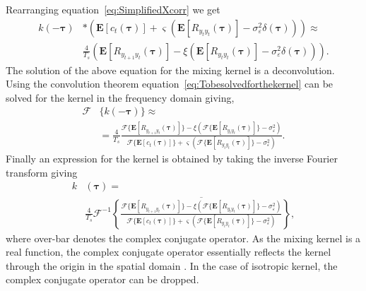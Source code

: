 \documentclass[10pt,twocolumn,twoside]{IEEEtran}
\begin{document}
Rearranging equation~\eqref{eq:SimplifiedXcorr} we get
\begin{align} \label{eq:Tobesolvedforthekernel}
	k(-\boldsymbol\tau) & \ast (\mathbf{E}\left[c_t(\boldsymbol\tau)\right] + \varsigma (\mathbf{E}\left[R_{y_ty_t}(\boldsymbol\tau)\right] - \sigma_{\varepsilon}^2 \delta(\boldsymbol\tau))) \approx  \nonumber \\
	& \frac{4}{T_s}(\mathbf{E}[R_{y_{t+1}y_t}(\boldsymbol{\tau})] - \xi\left(\mathbf{E}[ R_{y_ty_t}(\boldsymbol{\tau})] - \sigma_{\varepsilon}^2 \delta(\boldsymbol{\tau})\right)).
\end{align}
The solution of the above equation for the mixing kernel is a deconvolution. Using the convolution theorem equation~\eqref{eq:Tobesolvedforthekernel} can be solved for the kernel in the frequency domain giving,
\begin{align}
	\mathcal{F}&\{k(-\boldsymbol\tau)\} \approx  \nonumber \\
	&= \frac{4}{T_s} \frac{\mathcal{F}\{\mathbf{E}[R_{y_{t+1}y_t}(\boldsymbol{\tau})]\} - \xi\left(\mathcal{F}\{\mathbf{E}[ R_{y_ty_t}(\boldsymbol{\tau})]\} - \sigma_{\varepsilon}^2 \right)} {\mathcal{F}\{\mathbf{E}\left[c_t(\boldsymbol\tau)\right]\} + \varsigma (\mathcal{F}\{\mathbf{E}\left[R_{y_ty_t}(\boldsymbol\tau)\right]\} - \sigma_{\varepsilon}^2 )}.  \label{eq:Fourier_TF_of_Kernel}
\end{align} 
Finally an expression for the kernel is obtained by taking the inverse Fourier transform giving 
\begin{align}\label{eq:EM-Fourier_TF_of_Kernel}   
	k&(\boldsymbol\tau) = \nonumber \\
	&\frac{4}{T_s}\mathcal{F}^{-1}\overline{\left\{ \frac{\mathcal{F}\{\mathbf{E}[R_{y_{t+1}y_t}(\boldsymbol{\tau})]\} - \xi\left(\mathcal{F}\{\mathbf{E}[ R_{y_ty_t}(\boldsymbol{\tau})]\} - \sigma_{\varepsilon}^2 \right)}{\mathcal{F}\{\mathbf{E}\left[c_t(\boldsymbol\tau)\right]\} + \varsigma (\mathcal{F}\{\mathbf{E}\left[R_{y_ty_t}(\boldsymbol\tau)\right]\} - \sigma_{\varepsilon}^2 )} \right\}},
\end{align}
 where over-bar denotes the complex conjugate operator. As the mixing kernel is a real function, the complex conjugate operator essentially reflects the kernel through the origin in the spatial domain \cite{Bracewell2000}. In the case of isotropic kernel, the complex conjugate operator can be dropped. 
\end{document}
